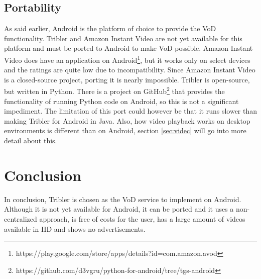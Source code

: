 \subsection{Portability}
As said earlier, Android is the platform of choice to provide the VoD functionality. Tribler and Amazon Instant Video are not yet available for this platform and must be ported to Android to make VoD possible. Amazon Instant Video does have an application on Android\footnote{https://play.google.com/store/apps/details?id=com.amazon.avod}, but it works only on select devices and the ratings are quite low due to incompatibility. Since Amazon Instant Video is a closed-source project, porting it is nearly impossible. Tribler is open-source, but written in Python. There is a project on GitHub\footnote{https://github.com/d3vgru/python-for-android/tree/tgs-android} that provides the functionality of running Python code on Android, so this is not a significant impediment. The limitation of this port could however be that it runs slower than making Tribler for Android in Java. Also, how video playback works on desktop environments is different than on Android, section \ref{sec:videc} will go into more detail about this.
\section{Conclusion}
In conclusion, Tribler is chosen as the VoD service to implement on Android. Although it is not yet available for Android, it can be ported and it uses a non-centralized approach, is free of costs for the user, has a large amount of videos available in HD and shows no advertisements.